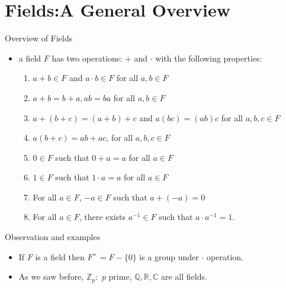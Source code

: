 \documentclass[ %
 10pt, xcolor={dvipsnames,svgnames,x11names,hyperref},
   hyperref={colorlinks=true,citecolor=green,linkcolor=DarkRed,urlcolor=ProcessBlue,anchorcolor=blue}
  ]{beamer}
\newenvironment{stepitemize}{\begin{itemize}[<+->]}{\end{itemize} }
\newcommand{\Z}{\mathbb{Z}}
\newcommand{\Q}{\mathbb{Q}}
\newcommand{\R}{\mathbb{R}}
\newcommand{\C}{\mathbb{C}}
\begin{document}
\section{Fields:A General Overview}
\begin{frame}{Overview of Fields}
\begin{stepitemize}
    \item a field $F$ has two operations: $+$ and $\cdot$ with the following properties:
\begin{enumerate}
    \item $a+b\in F$ and $a\cdot b \in F$ for all $a,b\in F$
    \item $a+b=b+a, ab=ba$ for all $a,b\in F$
    \item $a+(b+c)=(a+b)+c$ and $a(bc) = (ab)c$ for all $a,b,c \in F$
    \item $a(b+c)=ab+ac$, for all $a,b,c \in F$
    \item $0\in F$ such that $0+a=a$ for all $a\in F$
    \item $1\in F$ such that $1\cdot a=a$ for all $a\in F$
    \item For all $a\in F$, $-a \in F$ such that $a+(-a)=0$
    \item For all $a \in F$, there exists $a^{-1}\in F$ such that $a\cdot a^{-1}=1$.
\end{enumerate}
\end{stepitemize}
\end{frame}

\begin{frame}{Observation and examples}
\begin{stepitemize}
    \item If  $F$ is a field then $F^{\times} = F-\{0\}$ is a group under $\cdot$ operation.
\item As we saw before, $\Z_p:$ $p$ prime, $\Q, \R, \C$ are all fields. 
\end{stepitemize}
\end{frame}
\end{document}
